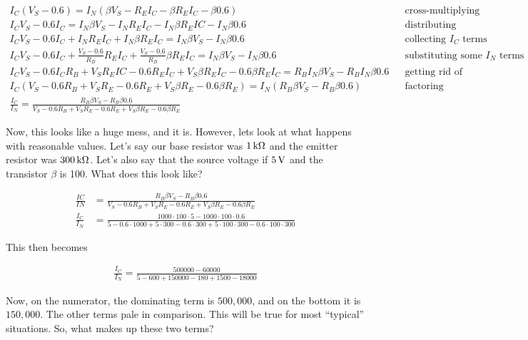 \begin{align*}
I_C(V_S - 0.6) = I_N(\beta V_S - R_E I_C - \beta R_E I_C - \beta 0.6) && \textrm{cross-multiplying} \\
I_C V_S - 0.6 I_C = I_N \beta V_S - I_N R_E I_C - I_N \beta R_E IC - I_N \beta 0.6 && \textrm{distributing} \\
I_C V_S - 0.6 I_C + I_N R_E I_C + I_N \beta R_E I_C =  I_N \beta V_S  -  I_N \beta 0.6 && \textrm{collecting $I_C$ terms} \\
I_C V_S - 0.6 I_C + \frac{V_S - 0.6}{R_B} R_E I_C + \frac{V_S - 0.6}{R_B} \beta R_E I_C =  I_N \beta V_S  -  I_N \beta 0.6 && \textrm{substituting some $I_N$ terms} \\
I_C V_S - 0.6 I_C R_B + V_S R_E IC - 0.6 R_E I_C + V_S \beta R_E I_C - 0.6 \beta R_E I_C =  R_B I_N \beta V_S  -  R_B I_N \beta 0.6 && \textrm{getting rid of fraction} \\
I_C(V_S - 0.6 R_B + V_S R_E - 0.6 R_E + V_S \beta R_E - 0.6 \beta R_E) =  I_N(R_B \beta V_S  -  R_B \beta 0.6) && \textrm{factoring} \\
\frac{I_C}{I_N} = \frac{R_B \beta V_S  -  R_B \beta 0.6}{V_S - 0.6 R_B + V_S R_E - 0.6 R_E + V_S \beta R_E - 0.6 \beta R_E}
\end{align*}

Now, this looks like a huge mess, and it is.
However, lets look at what happens with reasonable values.
Let's say our base resistor was $1\,\si{\kilo\ohm}$ and the emitter resistor was $300\,\si{\kilo\ohm}$.  
Let's also say that the source voltage if $5\,\si{\volt}$ and the transistor $\beta$ is 100.
What does this look like?

\begin{align*}
\frac{IC}{IN} &= \frac{R_B \beta V_S  -  R_B \beta 0.6}{V_S - 0.6 R_B + V_S R_E - 0.6 R_E + V_S \beta R_E - 0.6 \beta R_E} \\
\frac{I_C}{I_N} &= \frac{1000 \cdot 100 \cdot 5  -  1000\cdot 100 \cdot 0.6}{5 - 0.6 \cdot 1000 + 5 \cdot 300 - 0.6 \cdot 300 + 5\cdot 100 \cdot 300 - 0.6 \cdot 100 \cdot 300}
\end{align*}

This then becomes

\begin{align*}
\frac{I_C}{I_N} = \frac{500000 - 60000}{5 - 600 + 150000 - 180 + 1500 - 18000}
\end{align*}

Now, on the numerator, the dominating term is $500,000$, and on the bottom it is $150,000$.  
The other terms pale in comparison.
This will be true for most ``typical'' situations.
So, what makes up these two terms?

